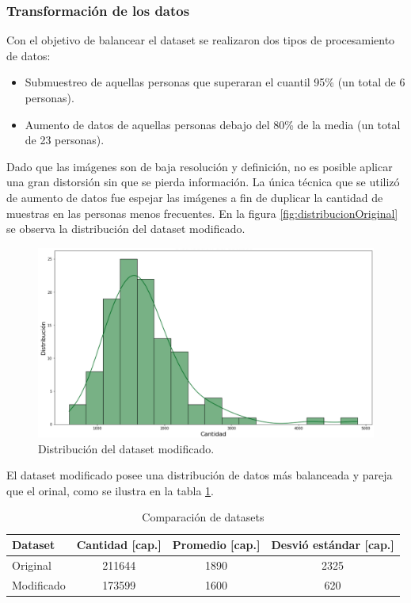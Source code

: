 \subsubsection{Transformación de los datos}

Con el objetivo de balancear el dataset se realizaron dos tipos de procesamiento de datos:
\begin{itemize}
\item Submuestreo de aquellas personas que superaran el cuantil 95\% (un total de 6 personas).
\item Aumento de datos de aquellas personas debajo del 80\% de la media (un total de 23 personas).
\end{itemize}

Dado que las imágenes son de baja resolución y definición, no es posible aplicar una gran distorsión sin que se pierda información. La única técnica que se utilizó de aumento de datos fue espejar las imágenes a fin de duplicar la cantidad de muestras en las personas menos frecuentes. En la figura \ref{fig:distribucionOriginal} se observa la distribución del dataset modificado.

\newpage

\begin{figure}[ht]
	\centering
	\includegraphics[scale=.50]{./Figures/distribucionFinal.png}
	\caption{Distribución del dataset modificado.}
	\label{fig:distribucionFinal}
\end{figure}

El dataset modificado posee una distribución de datos más balanceada y pareja que el orinal, como se ilustra en la tabla \ref{tab:datasets}.

\begin{table}[h]
	\centering
	\caption[Dataset]{Comparación de datasets}
	\begin{tabular}{l c c c}    
		\toprule
		\textbf{Dataset}   & \textbf{Cantidad [cap.]} & \textbf{Promedio [cap.]} & \textbf{Desvió estándar [cap.]}\\
		\midrule
		Original & 211644 & 1890   & 2325 \\		
		Modificado & 173599 & 1600  & 620 \\
		\bottomrule
		\hline
	\end{tabular}
	\label{tab:datasets}
\end{table}

